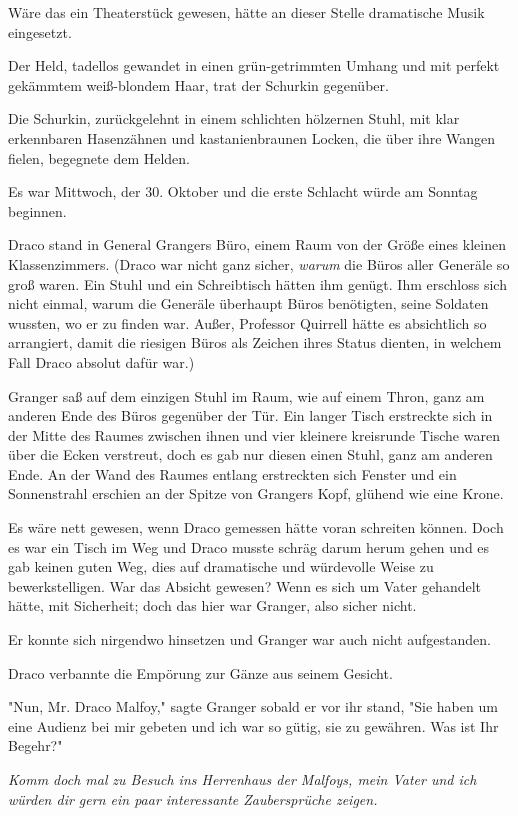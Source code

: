 {Wäre das ein Theaterstück gewesen, hätte an dieser Stelle dramatische Musik eingesetzt.

Der Held, tadellos gewandet in einen grün-getrimmten Umhang und mit perfekt gekämmtem weiß-blondem Haar, trat der Schurkin gegenüber.

Die Schurkin, zurückgelehnt in einem schlichten hölzernen Stuhl, mit klar erkennbaren Hasenzähnen und kastanienbraunen Locken, die über ihre Wangen fielen, begegnete dem Helden.

Es war Mittwoch, der 30. Oktober und die erste Schlacht würde am Sonntag beginnen.

Draco stand in General Grangers Büro, einem Raum von der Größe eines kleinen Klassenzimmers. (Draco war nicht ganz sicher, \emph{warum} die Büros aller Generäle so groß waren. Ein Stuhl und ein Schreibtisch hätten ihm genügt. Ihm erschloss sich nicht einmal, warum die Generäle überhaupt Büros benötigten, seine Soldaten wussten, wo er zu finden war. Außer, Professor Quirrell hätte es absichtlich so arrangiert, damit die riesigen Büros als Zeichen ihres Status dienten, in welchem Fall Draco absolut dafür war.)

Granger saß auf dem einzigen Stuhl im Raum, wie auf einem Thron, ganz am anderen Ende des Büros gegenüber der Tür. Ein langer Tisch erstreckte sich in der Mitte des Raumes zwischen ihnen und vier kleinere kreisrunde Tische waren über die Ecken verstreut, doch es gab nur diesen einen Stuhl, ganz am anderen Ende. An der Wand des Raumes entlang erstreckten sich Fenster und ein Sonnenstrahl erschien an der Spitze von Grangers Kopf, glühend wie eine Krone.

Es wäre nett gewesen, wenn Draco gemessen hätte voran schreiten können. Doch es war ein Tisch im Weg und Draco musste schräg darum herum gehen und es gab keinen guten Weg, dies auf dramatische und würdevolle Weise zu bewerkstelligen. War das Absicht gewesen? Wenn es sich um Vater gehandelt hätte, mit Sicherheit; doch das hier war Granger, also sicher nicht.

Er konnte sich nirgendwo hinsetzen und Granger war auch nicht aufgestanden.

Draco verbannte die Empörung zur Gänze aus seinem Gesicht.

"Nun, Mr. Draco Malfoy," sagte Granger sobald er vor ihr stand, "Sie haben um eine Audienz bei mir gebeten und ich war so gütig, sie zu gewähren. Was ist Ihr Begehr?"

\emph{Komm doch mal} \emph{zu Besuch ins Herrenhaus der Malfoys, mein Vater und ich würden dir gern ein paar interessante Zaubersprüche zeigen.}

}
